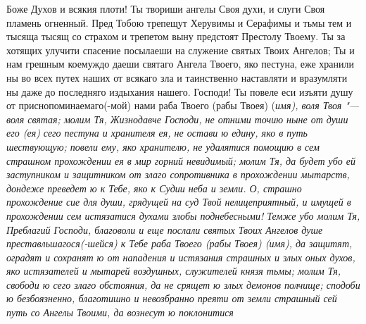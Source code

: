 Боже Духов и всякия плоти! Ты твориши ангелы Своя духи, и слуги Своя пламень огненный. Пред Тобою трепещут Херувимы и Серафимы и тьмы тем и тысяща тысящ со страхом и трепетом выну предстоят Престолу Твоему. Ты за хотящих улучити спасение посылаеши на служение святых Твоих Ангелов; Ты и нам грешным коемуждо даеши святаго Ангела Твоего, яко пестуна, еже хранили ны во всех путех наших от всякаго зла и таинственно наставляти и вразумляти ны даже до последняго издыхания нашего. Господи! Ты повеле еси изъяти душу от приснопоминаемаго(-мой) нами раба Твоего (рабы Твоея) (\itshape имя\normalfont{}), воля Твоя "--- воля святая; молим Тя, Жизнодавче Господи, не отними точию ныне от души его (ея) сего пестуна и хранителя ея, не остави ю едину, яко в путь шествующую; повели ему, яко хранителю, не удалятися помощию в сем страшном прохождении ея в мир горний невидимый; молим Тя, да будет убо ей заступником и защитником от злаго сопротивника в прохождении мытарств, дондеже преведет ю к Тебе, яко к Судии неба и земли. О, страшно прохождение сие для души, грядущей на суд Твой нелицеприятный, и имущей в прохождении сем истязатися духами злобы поднебесными! Темже убо молим Тя, Преблагий Господи, благоволи и еще послали святых Твоих Ангелов душе преставльшагося(-шейся) к Тебе раба Твоего (рабы Твоея) (\itshape имя\normalfont{}), да защитят, оградят и сохранят ю от нападения и истязания страшных и злых оных духов, яко истязателей и мытарей воздушных, служителей князя тьмы; молим Тя, свободи ю сего злаго обстояния, да не срящет ю злых демонов полчище; сподоби ю безбоязненно, благотишно и невозбранно преяти от земли страшный сей путь со Ангелы Твоими, да вознесут ю поклонитися 


\mychapterending

 



